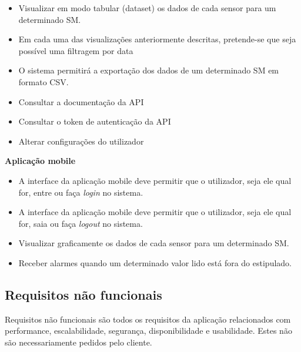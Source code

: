 \begin{itemize}
	
	\item Visualizar em modo tabular (dataset) os dados de cada sensor para um determinado \ac{SM}. 
	
	\item Em cada uma das visualizações anteriormente descritas, pretende-se que seja possível uma filtragem por data
	
	
	\item O sistema permitirá a exportação dos dados de um determinado \ac{SM} em formato \ac{CSV}. 
	
	
	\item  Consultar a documentação da API 
	
	\item Consultar o token de autenticação da API 
	
	
	\item Alterar configurações do utilizador 
	
	
	
\end{itemize}


\textbf{Aplicação mobile}



\begin{itemize}
	\item A interface da aplicação mobile deve permitir que o utilizador, seja ele qual for, entre ou faça \textit{login} no sistema. 
	
	\item A interface da aplicação mobile deve permitir que o utilizador, seja ele qual for, saia ou faça \textit{logout} no sistema.
	
	
	\item Visualizar graficamente os dados de cada sensor para um determinado \ac{SM}. 
	
	\item Receber alarmes quando um determinado valor lido está fora do estipulado.
	
	
\end{itemize}



\subsection{Requisitos não funcionais}


Requisitos não funcionais são todos os requisitos da aplicação relacionados com
performance, escalabilidade, segurança, disponibilidade e usabilidade. Estes não são
necessariamente pedidos pelo cliente. 


